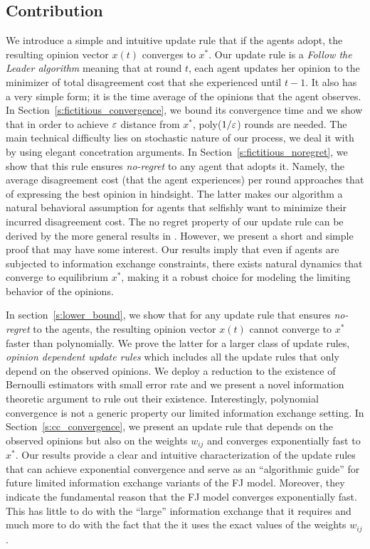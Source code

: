 \subsection{Contribution}
We introduce a simple and intuitive update rule that if the agents adopt,
the resulting opinion vector $x(t)$ converges to $x^*$.
Our update rule is a \emph{Follow the Leader algorithm}
meaning that at round $t$, each agent updates her opinion
to the minimizer of total disagreement cost that
she experienced until $t-1$. It also has a very simple form;
it is the time average of the opinions that the agent observes.
In Section~\ref{s:fictitious_convergence},
we bound its convergence time and we show that in order
to achieve $\varepsilon$ distance from $x^*$, poly($1/\varepsilon$) rounds
are needed. The main technical difficulty lies on stochastic nature
of our process, we deal it with by using elegant concetration arguments.
In Section~\ref{s:fictitious_noregret},
we show that this rule ensures \emph{no-regret} to any agent
that adopts it. Namely, the average disagreement cost (that
the agent experiences) per round approaches that
of expressing the best opinion in hindsight. The latter
makes our algorithm a natural behavioral assumption for
agents that selfishly want to minimize their incurred disagreement cost.
The no regret property of our update rule can be derived by the more general
results in \cite{HAK07}.  However, we present a short and simple proof that may
have some interest. Our results imply that even
if agents are subjected to information exchange constraints, there exists natural
dynamics that converge to equilibrium $x^*$, making it
a robust choice for modeling the limiting behavior of the opinions.

In section~\ref{s:lower_bound}, we show
that for any update rule that ensures \emph{no-regret}
to the agents, the resulting opinion vector $x(t)$
cannot converge to $x^*$ faster than polynomially.
We prove the latter for a larger class of update rules,
\emph{opinion dependent update rules} which includes
all the update rules that only depend on the observed
opinions. We deploy a reduction to the existence of
Bernoulli estimators with small error rate and we present
a novel information theoretic argument to rule out their
existence.  Interestingly, polynomial convergence is not a
generic property our limited information exchange setting.
In Section~\ref{s:cc_convergence}, we present an update rule
that depends on the observed opinions but also on the weights
$w_{ij}$ and converges exponentially fast to $x^*$. Our results
provide a clear and intuitive characterization of the update
rules that can achieve exponential convergence and serve as
an \enquote{algorithmic guide} for future limited information exchange
variants of the FJ model.  Moreover, they indicate the fundamental reason that
the FJ model converges exponentially fast. This has little
to do with the \enquote{large} information exchange that it requires and much
more to do with the fact that the it uses the exact values of the weights $w_{ij}$.

